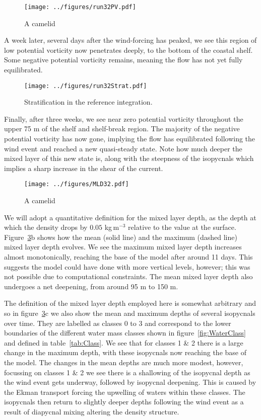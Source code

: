 \begin{figure} 
    \centering
    \texttt{[image: ../figures/run32PV.pdf]}
    \caption{A camelid}
    \label{fig:EnsStandardPV}
\end{figure}

A week later, several days after the wind-forcing has peaked, we see this region of low potential vorticity now penetrates deeply, to the bottom of the coastal shelf. Some negative potential vorticity remains, meaning the flow has not yet fully equilibrated.

\begin{figure} 
    \centering
    \texttt{[image: ../figures/run32Strat.pdf]}
    \caption{Stratification in the reference integration.}
    \label{fig:Camelid}
\end{figure}

Finally, after three weeks, we see near zero potential vorticity throughout the upper 75 m of the shelf and shelf-break region. The majority of the negative potential vorticity has now gone, implying the flow has equilibrated following the wind event and reached a new quasi-steady state. Note how much deeper the mixed layer of this new state is, along with the steepness of the isopycnals which implies a sharp increase in the shear of the current.

\begin{figure} 
    \centering
    \texttt{[image: ../figures/MLD32.pdf]}
    \caption{A camelid}
    \label{fig:EnsStandardMLD}
\end{figure}

We will adopt a quantitative definition for the mixed layer depth, as the depth at which the density drops by $0.05$ kg\,m$^{-3}$ relative to the value at the surface. Figure~\ref{fig:EnsStandardMLD}b shows how the mean (solid line) and the maximum (dashed line) mixed layer depth evolves. We see the maximum mixed layer depth increases almost monotonically, reaching the base of the model after around 11 days. This suggests the model could have done with more vertical levels, however; this was not possible due to computational constraints. The mean mixed layer depth also undergoes a net deepening, from around 95 m to 150 m.

The definition of the mixed layer depth employed here is somewhat arbitrary and so in figure~\ref{fig:EnsStandardMLD}c we also show the mean and maximum depths of several isopycnals over time. They are labelled as classes 0 to 3 and correspond to the lower boundaries of the different water mass classes shown in figure~\ref{fig:WaterClass} and defined in table~\ref{tab:Class}. We see that for classes 1 \& 2 there is a large change in the maximum depth, with these isopycnals now reaching the base of the model. The changes in the mean depths are much more modest, however, focussing on classes 1 \& 2 we see there is a shallowing of the isopycnal depth as the wind event gets underway, followed by isopycnal deepening. This is caused by the Ekman transport forcing the upwelling of waters within these classes. The isopycnals then return to slightly deeper depths following the wind event as a result of diapycnal mixing altering the density structure.


